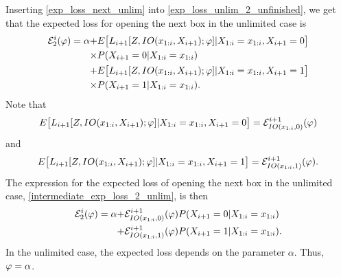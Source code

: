 Inserting \eqref{exp_loss_next_unlim} into \eqref{exp_loss_unlim_2_unfinished}, we get that the expected loss for opening the next box in the unlimited case is
\begin{equation}
\label{intermediate_exp_loss_2_unlim}
    \begin{aligned}
        \mathcal{E}^i_{2}(\varphi) = \alpha 
        + &E \big[L_{i+1}[Z,IO(x_{1:i},X_{i+1});\varphi] |X_{1:i}=x_{1:i},X_{i+1}=0\big]\\
        \times & P(X_{i+1}=0|X_{1:i}=x_{1:i}) \\
        +& E \big[L_{i+1}[Z,IO(x_{1:i},X_{i+1});\varphi] |X_{1:i}=x_{1:i},X_{i+1}=1\big]\\
        \times& P(X_{i+1}=1|X_{1:i}=x_{1:i}).
    \end{aligned}
\end{equation}
Note that
\begin{equation*}
    E \big[L_{i+1}[Z,IO(x_{1:i},X_{i+1});\varphi] |X_{1:i}=x_{1:i},X_{i+1}=0\big] = \mathcal{E}^{i+1}_{IO(x_{1:i},0)}(\varphi)
\end{equation*}
and
\begin{equation*}
    E \big[L_{i+1}[Z,IO(x_{1:i},X_{i+1});\varphi] |X_{1:i}=x_{1:i},X_{i+1}=1\big] = \mathcal{E}^{i+1}_{IO(x_{1:i},1)}(\varphi).
\end{equation*}
The expression for the expected loss of opening the next box in the unlimited case, \eqref{intermediate_exp_loss_2_unlim}, is then
\begin{equation}
\label{exp_loss_next_box_unlim}
    \begin{aligned}
        \mathcal{E}^i_{2}(\varphi) 
        = \alpha + &\mathcal{E}^{i+1}_{IO(x_{1:i},0)}(\varphi) P(X_{i+1}=0|X_{1:i}=x_{1:i})\\
        + &\mathcal{E}^{i+1}_{IO(x_{1:i},1)} (\varphi)
        P(X_{i+1}=1|X_{1:i}=x_{1:i}).
    \end{aligned}
\end{equation}
In the unlimited case, the expected loss depends on the parameter $\alpha$. Thus, $\varphi = \alpha$. 

